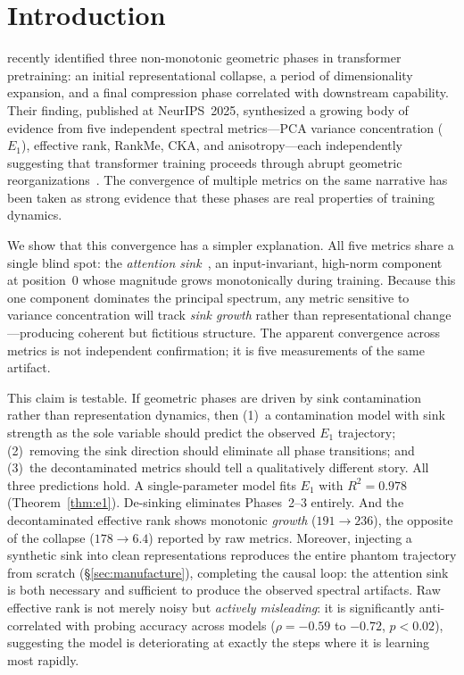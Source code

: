 \documentclass[11pt]{article}
\begin{document}
\section{Introduction}\label{sec:intro}

\citet{li2025tracing} recently identified three non-monotonic geometric phases in transformer pretraining: an initial representational collapse, a period of dimensionality expansion, and a final compression phase correlated with downstream capability.
Their finding, published at NeurIPS~2025, synthesized a growing body of evidence from five independent spectral metrics---PCA variance concentration ($E_1$), effective rank, RankMe, CKA, and anisotropy---each independently suggesting that transformer training proceeds through abrupt geometric reorganizations~\citep{garrido2023rankme,ethayarajh2019contextual,raghu2021vision,timkey2021all}.
The convergence of multiple metrics on the same narrative has been taken as strong evidence that these phases are real properties of training dynamics.

We show that this convergence has a simpler explanation.
All five metrics share a single blind spot: the \emph{attention sink}~\citep{xiao2024efficient}, an input-invariant, high-norm component at position~0 whose magnitude grows monotonically during training.
Because this one component dominates the principal spectrum, any metric sensitive to variance concentration will track \emph{sink growth} rather than representational change---producing coherent but fictitious structure.
The apparent convergence across metrics is not independent confirmation; it is five measurements of the same artifact.

This claim is testable.
If geometric phases are driven by sink contamination rather than representation dynamics, then (1)~a contamination model with sink strength as the sole variable should predict the observed $E_1$ trajectory; (2)~removing the sink direction should eliminate all phase transitions; and (3)~the decontaminated metrics should tell a qualitatively different story.
All three predictions hold.
A single-parameter model fits $E_1$ with $R^2 = 0.978$ (Theorem~\ref{thm:e1}).
De-sinking eliminates Phases~2--3 entirely.
And the decontaminated effective rank shows monotonic \emph{growth} ($191 \to 236$), the opposite of the collapse ($178 \to 6.4$) reported by raw metrics.
Moreover, injecting a synthetic sink into clean representations reproduces the entire phantom trajectory from scratch (\S\ref{sec:manufacture}), completing the causal loop: the attention sink is both necessary and sufficient to produce the observed spectral artifacts.
Raw effective rank is not merely noisy but \emph{actively misleading}: it is significantly anti-correlated with probing accuracy across models ($\rho = -0.59$ to $-0.72$, $p < 0.02$), suggesting the model is deteriorating at exactly the steps where it is learning most rapidly.
\end{document}
